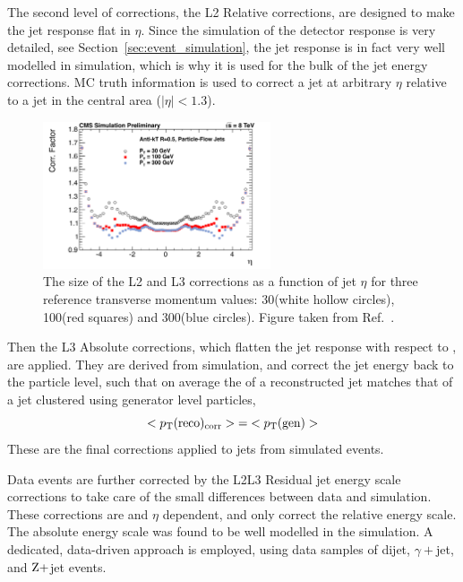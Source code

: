 The second level of corrections, the L2 Relative corrections, are designed to make the jet response
flat in $\eta$. Since the simulation of the detector response is very detailed, see
Section~\ref{sec:event_simulation}, the jet response is in fact very well modelled in simulation,
which is why it is used for the bulk of the jet energy corrections. 
MC truth information is used to correct a jet at arbitrary $\eta$ relative to a jet
in the central area ($|\eta|<1.3$). 

\begin{figure}[tpb]
  \centering
\includegraphics[width=0.6\textwidth]
{figures/eventreco_objects/CorrectionVsEta_Overview_TDR_ak5pfl1_L2L3}
  \caption{ The size of the L2 and L3 corrections as a function of jet $\eta$ for three reference
transverse momentum values: 30\GeV (white hollow circles), 100\GeV (red squares) and 300\GeV (blue
circles). Figure taken from Ref.~\cite{JEC_plots2}.
  \label{fig:JEC_L23}}
\end{figure}


Then the L3 Absolute corrections, which flatten the jet response with respect to \pt, are applied.
They are derived from simulation, and correct the jet energy back to the particle level, such that
on average the \pt of a reconstructed jet matches that of a jet clustered using generator level
particles,
\begin{equation}
  <p_{\mathrm{T}}(\mathrm{reco})_{\mathrm{corr}}> {=} <p_{\mathrm{T}}(\mathrm{gen})>
\end{equation}
These are the final corrections applied to jets from simulated events. 

Data events are further corrected by the L2L3 Residual jet energy scale corrections to take care of
the small differences between data and simulation. These corrections are \pt and $\eta$ dependent,
and only correct the relative energy scale. The absolute energy scale was found to be well modelled
in the simulation. A dedicated, data-driven approach is employed, using data samples of dijet,
$\gamma+$jet, and $\mathrm{Z}+$jet events. 

